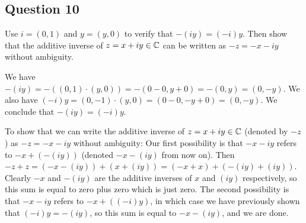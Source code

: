 \subsection{Question 10}
\begin{prob}
    Use $i=(0,1)$ and $y=(y,0)$ to verify that $-(iy)=(-i)y.$ Then show that the additive inverse of $z=x+iy \in \mathbb{C}$ can be written as $-z=-x-iy$ without ambiguity.
\end{prob}
\begin{solution}
    We have $-(iy)=-\left( (0,1)\cdot(y,0) \right) = -\left( 0-0, y+0 \right) = -(0,y)=(0,-y)$. We also have $(-i)y=(0,-1)\cdot(y,0)=(0-0, -y+0)=(0,-y).$ We conclude that $-(iy)=(-i)y.$ 

    To show that we can write the additive inverse of $z = x+iy \in \mathbb{C}$ (denoted by $-z$ ) as $-z=-x-iy$ without ambiguity: Our first possibility is that $-x-iy$ refers to $-x+\left( -(iy) \right) $ (denoted $-x-(iy)$ from now on). Then $-z+z=(-x-(iy))+(x+(iy))=(-x+x)+(-(iy)+(iy))$. Clearly $-x$ and $-(iy)$ are the additive inverses of $x$ and $(iy)$ respectively, so this sum is equal to zero plus zero which is just zero. The second possibility is that $-x-iy$ refers to $-x+((-i)y)$, in which case we have previously shown that $(-i)y=-(iy)$, so this sum is equal to $-x-(iy)$, and we are done.
\end{solution}
